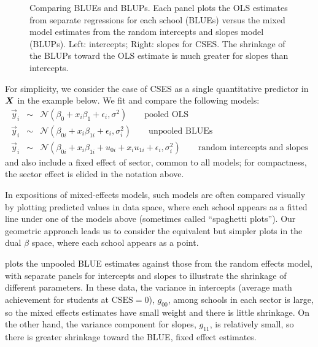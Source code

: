 \begin{figure}[htb]
\begin{minipage}[b]{.49\linewidth}
 \end{minipage}
  \caption{Comparing BLUEs and BLUPs. Each panel plots the OLS estimates from separate regressions for each school (BLUEs)
  versus the mixed model estimates from the random intercepts and slopes model (BLUPs).
  Left: intercepts; Right: slopes for CSES.  The shrinkage of the BLUPs toward the OLS estimate is much greater for slopes than
  intercepts. }
  \label{fig:hsbmix4}
\end{figure}

For simplicity, we consider the case of CSES as
a single quantitative predictor in $\bm{X}$ in the example below.  We fit and compare the following models:
\begin{eqnarray}
 \vec{y}_{i} & \sim & \mathcal{N} ( \beta_0 + x_{i} \beta_1 + \epsilon_{i}  , \sigma^2 ) \quad\quad \textrm{pooled OLS} \\
 \vec{y}_{i} & \sim & \mathcal{N} ( \beta_{0i} + x_{i} \beta_{1i} + \epsilon_{i}  , \sigma^2_i ) \quad\quad \textrm{unpooled BLUEs} \\
 \vec{y}_{i} & \sim & \mathcal{N} ( \beta_{0i} + x_{i} \beta_{1i} + u_{0i} + x_{i} u_{1i} + \epsilon_{i}  , \sigma^2_i ) \quad\quad \textrm{random intercepts and slopes}
%
\end{eqnarray}
and also include a fixed effect of sector, common to all models; for compactness, the sector effect is elided in the notation above.

In expositions of mixed-effects models, such models are often compared visually by plotting predicted values in data space, where each school appears
as a fitted line under one of the models above (sometimes called ``spaghetti plots'').
Our geometric approach leads us to consider the equivalent but simpler plots in the dual $\beta$ space,
where each school appears as a point.

 plots the unpooled BLUE estimates against those from the random effects model, with separate panels for intercepts
and slopes to illustrate the shrinkage of different parameters.  In these data, the variance in intercepts (average math achievement
for students at $\mathrm{CSES}=0$), $g_{00}$,
among schools in each sector is large, so the mixed effects estimates have small weight and there is little
shrinkage.  On the other hand, the variance component for slopes, $g_{11}$, is relatively small, so there is greater
shrinkage toward the BLUE, fixed effect estimates.


